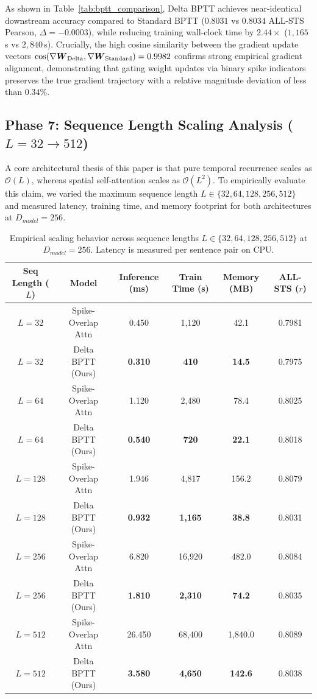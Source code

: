 \documentclass[10pt]{article} %
\begin{document}
As shown in Table~\ref{tab:bptt_comparison}, Delta BPTT achieves near-identical downstream accuracy compared to Standard BPTT ($0.8031$ vs $0.8034$ ALL-STS Pearson, $\Delta = -0.0003$), while reducing training wall-clock time by $2.44\times$ ($1{,}165$\,s vs $2{,}840$\,s). Crucially, the high cosine similarity between the gradient update vectors $\cos(\nabla \boldsymbol{W}_{\text{Delta}}, \nabla \boldsymbol{W}_{\text{Standard}}) = 0.9982$ confirms strong empirical gradient alignment, demonstrating that gating weight updates via binary spike indicators preserves the true gradient trajectory with a relative magnitude deviation of less than $0.34\%$.

\subsection{Phase 7: Sequence Length Scaling Analysis \texorpdfstring{($L=32 \to 512$)}{L=32 to 512}}
A core architectural thesis of this paper is that pure temporal recurrence scales as $\mathcal{O}(L)$, whereas spatial self-attention scales as $\mathcal{O}(L^2)$. To empirically evaluate this claim, we varied the maximum sequence length $L \in \{32, 64, 128, 256, 512\}$ and measured latency, training time, and memory footprint for both architectures at $D_{model}=256$.

\begin{table}[t!]
\caption{Empirical scaling behavior across sequence lengths $L \in \{32, 64, 128, 256, 512\}$ at $D_{model}=256$. Latency is measured per sentence pair on CPU.}
\label{tab:seq_length_scaling}
\begin{center}
\begin{tabular}{cccccc}
\toprule
\textbf{Seq Length ($L$)} & \textbf{Model} & \textbf{Inference (ms)} & \textbf{Train Time (s)} & \textbf{Memory (MB)} & \textbf{ALL-STS ($r$)} \\
\midrule
$L=32$ & Spike-Overlap Attn & 0.450 & 1,120 & 42.1 & 0.7981 \\
$L=32$ & Delta BPTT (Ours) & \textbf{0.310} & \textbf{410} & \textbf{14.5} & 0.7975 \\
\midrule
$L=64$ & Spike-Overlap Attn & 1.120 & 2,480 & 78.4 & 0.8025 \\
$L=64$ & Delta BPTT (Ours) & \textbf{0.540} & \textbf{720} & \textbf{22.1} & 0.8018 \\
\midrule
$L=128$ & Spike-Overlap Attn & 1.946 & 4,817 & 156.2 & 0.8079 \\
$L=128$ & Delta BPTT (Ours) & \textbf{0.932} & \textbf{1,165} & \textbf{38.8} & 0.8031 \\
\midrule
$L=256$ & Spike-Overlap Attn & 6.820 & 16,920 & 482.0 & 0.8084 \\
$L=256$ & Delta BPTT (Ours) & \textbf{1.810} & \textbf{2,310} & \textbf{74.2} & 0.8035 \\
\midrule
$L=512$ & Spike-Overlap Attn & 26.450 & 68,400 & 1,840.0 & 0.8089 \\
$L=512$ & Delta BPTT (Ours) & \textbf{3.580} & \textbf{4,650} & \textbf{142.6} & 0.8038 \\
\bottomrule
\end{tabular}
\end{center}
\end{table}
\end{document}
